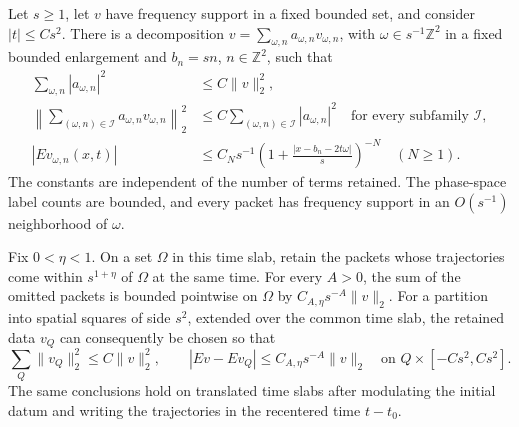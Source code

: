 \begin{lemma}
\label{lem:packets}
Let $s\geq1$, let $v$ have frequency support in a fixed bounded set, and
consider $|t|\leq Cs^2$.  There is a decomposition
$v=\sum_{\omega,n}a_{\omega,n}v_{\omega,n}$, with
$\omega\in s^{-1}\mathbb{Z}^2$ in a fixed bounded enlargement and
$b_n=sn$, $n\in\mathbb{Z}^2$, such that
\begin{align}
 \sum_{\omega,n}|a_{\omega,n}|^2&\leq C\|v\|_2^2,
 \label{eq:prelim-packet-energy}\\
 \left\|\sum_{(\omega,n)\in\mathcal I}
                  a_{\omega,n}v_{\omega,n}\right\|_2^2
 &\leq C\sum_{(\omega,n)\in\mathcal I}|a_{\omega,n}|^2
 \quad\text{for every subfamily }\mathcal I,
 \label{eq:prelim-subseries-energy}\\
 |Ev_{\omega,n}(x,t)|&\leq C_Ns^{-1}
 \left(1+\frac{|x-b_n-2t\omega|}{s}\right)^{-N}
 \quad(N\geq1).
 \label{eq:prelim-packet-decay}
\end{align}
The constants are independent of the number of terms retained.  The
phase-space label counts are bounded, and every packet has frequency support
in an $O(s^{-1})$ neighborhood of $\omega$.

Fix $0<\eta<1$.  On a set $\Omega$ in this time slab, retain the packets
whose trajectories come within $s^{1+\eta}$ of $\Omega$ at the same time.
For every $A>0$, the sum of the omitted packets is bounded pointwise on
$\Omega$ by $C_{A,\eta}s^{-A}\|v\|_2$.
For a partition into spatial squares of side $s^2$, extended over the common
time slab, the retained data $v_Q$ can consequently be chosen so that
\begin{equation}
 \sum_Q\|v_Q\|_2^2\leq C\|v\|_2^2,
 \qquad
 |Ev-Ev_Q|\leq C_{A,\eta}s^{-A}\|v\|_2
 \quad\text{on }Q\times[-Cs^2,Cs^2].
 \label{eq:prelim-box-localization}
\end{equation}
The same conclusions hold on translated time slabs after modulating the
initial datum and writing the trajectories in the recentered time $t-t_0$.
\end{lemma}


